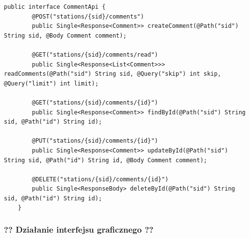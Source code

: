 \begin{lstlisting}[label=list:android_api_comment,caption=Plik \texttt{main/java/com/example/testapp/api/api/CommentApi.java},basicstyle=\tiny\ttfamily]
    public interface CommentApi {
        @POST("stations/{sid}/comments")
        public Single<Response<Comment>> createComment(@Path("sid") String sid, @Body Comment comment);
    
        @GET("stations/{sid}/comments/read")
        public Single<Response<List<Comment>>> readComments(@Path("sid") String sid, @Query("skip") int skip, @Query("limit") int limit);
    
        @GET("stations/{sid}/comments/{id}")
        public Single<Response<Comment>> findById(@Path("sid") String sid, @Path("id") String id);
    
        @PUT("stations/{sid}/comments/{id}")
        public Single<Response<Comment>> updateById(@Path("sid") String sid, @Path("id") String id, @Body Comment comment);
    
        @DELETE("stations/{sid}/comments/{id}")
        public Single<ResponseBody> deleteById(@Path("sid") String sid, @Path("id") String id);
    }
\end{lstlisting}

\subsubsection{?? Działanie interfejsu graficznego ??}

